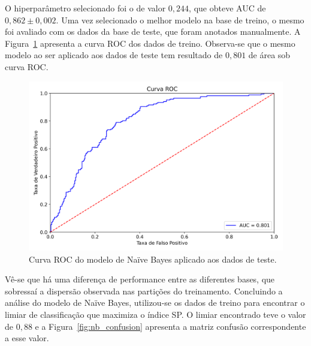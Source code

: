 O hiperparâmetro selecionado foi o de valor $0,244$, que obteve AUC de $0,862 \pm 0,002$.
Uma vez selecionado o melhor modelo na base de treino, o mesmo foi avaliado com
os dados da base de teste, que foram anotados manualmente.
A Figura~\ref{fig:nb_roc} apresenta a curva ROC dos dados de treino.
Observa-se que o mesmo modelo ao ser aplicado aos dados de teste tem resultado
de $0,801$ de área sob curva ROC.

\begin{figure}[h!]
\begin{center} {
    \begin{center}
    \includegraphics[scale=0.65]{images/nb_roc.png}
    \caption{Curva ROC do modelo de Naïve Bayes aplicado aos dados de teste.}
    \label{fig:nb_roc}
    \end{center}
}
\end{center}
\end{figure}

Vê-se que há uma diferença de performance entre as diferentes bases, que
sobressaí a dispersão observada nas partições do treinamento.
Concluindo a análise do modelo de Naïve Bayes, utilizou-se os dados de treino
para encontrar o limiar de classificação que maximiza o índice SP.
O limiar encontrado teve o valor de $0,88$ e a Figura~\ref{fig:nb_confusion}
apresenta a matriz confusão correspondente a esse valor.

